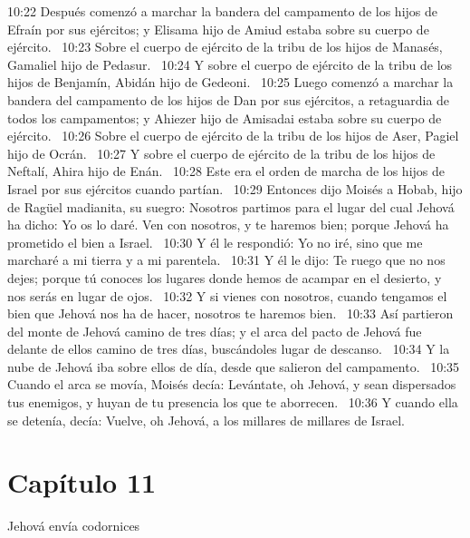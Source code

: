 10:22 Después comenzó a marchar la bandera del campamento de los hijos de Efraín por sus ejércitos; y Elisama hijo de Amiud estaba sobre su cuerpo de ejército.  
10:23 Sobre el cuerpo de ejército de la tribu de los hijos de Manasés, Gamaliel hijo de Pedasur.  
10:24 Y sobre el cuerpo de ejército de la tribu de los hijos de Benjamín, Abidán hijo de Gedeoni.  
10:25 Luego comenzó a marchar la bandera del campamento de los hijos de Dan por sus ejércitos, a retaguardia de todos los campamentos; y Ahiezer hijo de Amisadai estaba sobre su cuerpo de ejército.  
10:26 Sobre el cuerpo de ejército de la tribu de los hijos de Aser, Pagiel hijo de Ocrán.  
10:27 Y sobre el cuerpo de ejército de la tribu de los hijos de Neftalí, Ahira hijo de Enán.  
10:28 Este era el orden de marcha de los hijos de Israel por sus ejércitos cuando partían.  
10:29 Entonces dijo Moisés a Hobab, hijo de Ragüel madianita, su suegro: Nosotros partimos para el lugar del cual Jehová ha dicho: Yo os lo daré. Ven con nosotros, y te haremos bien; porque Jehová ha prometido el bien a Israel.  
10:30 Y él le respondió: Yo no iré, sino que me marcharé a mi tierra y a mi parentela.  
10:31 Y él le dijo: Te ruego que no nos dejes; porque tú conoces los lugares donde hemos de acampar en el desierto, y nos serás en lugar de ojos.  
10:32 Y si vienes con nosotros, cuando tengamos el bien que Jehová nos ha de hacer, nosotros te haremos bien.  
10:33 Así partieron del monte de Jehová camino de tres días; y el arca del pacto de Jehová fue delante de ellos camino de tres días, buscándoles lugar de descanso.  
10:34 Y la nube de Jehová iba sobre ellos de día, desde que salieron del campamento.  
10:35 Cuando el arca se movía, Moisés decía: Levántate, oh Jehová, y sean dispersados tus enemigos, y huyan de tu presencia los que te aborrecen.  
10:36 Y cuando ella se detenía, decía: Vuelve, oh Jehová, a los millares de millares de Israel.  
\section*{Capítulo 11 }
Jehová envía codornices  

